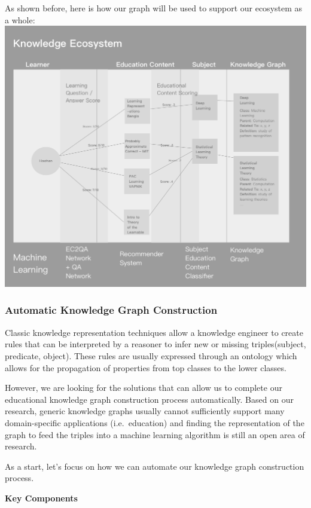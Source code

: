 \documentclass{acm_proc_article-sp}
\renewcommand{\paragraph}[1]{\vskip 6pt\noindent\textbf{#1 }}
\begin{document}
As shown before, here is how our graph will be used to support our
ecosystem as a whole: \includegraphics{img/knowledgeEcosystem.png}

\subsubsection{Automatic Knowledge Graph
Construction}\label{automatic-knowledge-graph-construction}

Classic knowledge representation techniques allow a knowledge engineer
to create rules that can be interpreted by a reasoner to infer new or
missing triples(subject, predicate, object). These rules are usually
expressed through an ontology which allows for the propagation of
properties from top classes to the lower classes.

However, we are looking for the solutions that can allow us to complete
our educational knowledge graph construction process automatically.
Based on our research, generic knowledge graphs usually cannot
sufficiently support many domain-specific applications (i.e.~education)
and finding the representation of the graph to feed the triples into a
machine learning algorithm is still an open area of research.

As a start, let's focus on how we can automate our knowledge graph
construction process.

\paragraph{Key Components}\label{key-components}
\end{document}
